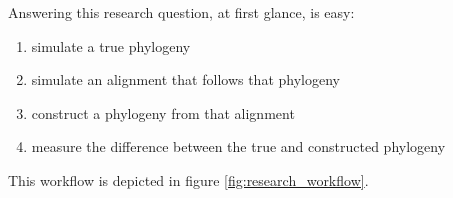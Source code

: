 Answering this research question, at first glance, is easy: 

\begin{enumerate}
	\item simulate a true phylogeny
	\item simulate an alignment that follows that phylogeny
	\item construct a phylogeny from that alignment
  \item measure the difference between the true and constructed phylogeny
\end{enumerate}

This workflow is depicted in figure \ref{fig:research_workflow}.

